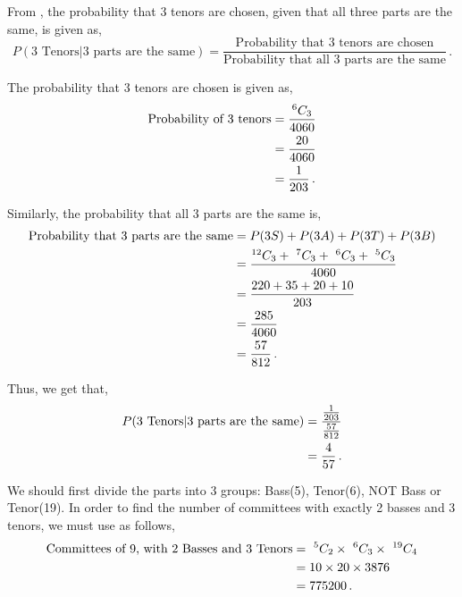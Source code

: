 \begin{subquestions}
\begin{subsubquestions}
\begin{subsubsubquestions}
\subsubsubquestion

From , the probability that 3 tenors are chosen, given that all three parts are the same, is given as,
\begin{equation}
 	P(\text{3 Tenors|3 parts are the same}) = \frac{\text{Probability that 3 tenors are chosen}}{\text{Probability that all 3 parts are the same}} \,.
\end{equation}

The probability that 3 tenors are chosen is given as,
\begin{align}
	\text{Probability of 3 tenors} & = \frac{^{6}C_3}{4060} \nonumber \\
	                               & = \frac{20}{4060} \nonumber \\
	                               & = \frac{1}{203} \,.
\end{align}

Similarly, the probability that all 3 parts are the same is,
\begin{align}
	\text{Probability that 3 parts are the same} & = P(3S) + P(3A) + P(3T) + P(3B)\nonumber \\
												& = \frac{^{12}C_3 + ~^{7}C_3 + ~^{6}C_3 + ~^{5}C_3}{4060} \nonumber \\
												& = \frac{220+35+20+10}{203} \nonumber \\
												& = \frac{285}{4060} \nonumber \\
												& = \frac{57}{812} \,.
\end{align}

Thus, we get that,
\begin{align}
	P(\text{3 Tenors|3 parts are the same}) & = \frac{\frac{1}{203}}{\frac{57}{812}} \nonumber \\
	                                        & = \frac{4}{57} \,.
\end{align}

\end{subsubsubquestions}


\subsubquestion

We should first divide the parts into 3 groups: Bass(5), Tenor(6), NOT Bass or Tenor(19). In order to find the number of committees with exactly 2 basses and 3 tenors, we must use  as follows,
\begin{align}
	\text{Committees of 9, with 2 Basses and 3 Tenors} & = ~^5C_2 \times ~^6C_3 \times ~^{19}C_4 \nonumber \\
	                                                   & = 10 \times 20 \times 3876 \nonumber \\
	                                                   & = 775200 \,.
\end{align}


\end{subsubquestions}
\end{subquestions}
